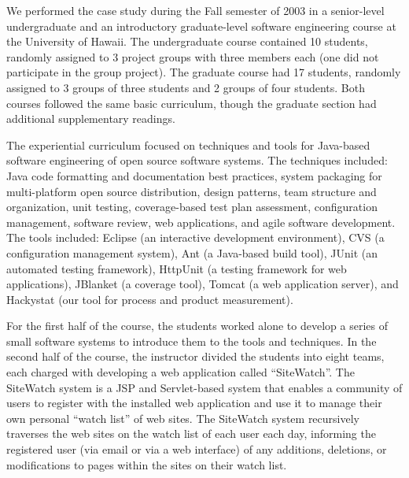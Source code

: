 \documentclass[10pt,twocolumn]{article}
\begin{document}
\label{sec:classroom}

We performed the case study during the Fall semester of 2003 in a
senior-level undergraduate and an introductory graduate-level software
engineering course at the University of Hawaii.  The undergraduate course
contained 10 students, randomly assigned to 3 project groups with
three members each (one did not participate in the group project). The
graduate course had 17 students, randomly assigned to 3 groups of
three students and 2 groups of four students.  Both courses followed the
same basic curriculum, though the graduate section had additional
supplementary readings.  

The experiential curriculum focused on techniques and tools for Java-based
software engineering of open source software systems. The techniques
included: Java code formatting and documentation best practices, system
packaging for multi-platform open source distribution, design patterns,
team structure and organization, unit testing, coverage-based test plan
assessment, configuration management, software review, web applications,
and agile software development. The tools included: Eclipse (an interactive
development environment), CVS (a configuration management system), Ant (a
Java-based build tool), JUnit (an automated testing framework), HttpUnit (a
testing framework for web applications), JBlanket (a coverage tool), Tomcat
(a web application server), and Hackystat (our tool for process and product
measurement).

For the first half of the course, the students worked alone to develop a
series of small software systems to introduce them to the tools and
techniques.  In the second half of the course, the instructor divided the
students into eight teams, each charged with developing a web application
called ``SiteWatch''.  The SiteWatch system is a JSP and Servlet-based
system that enables a community of users to register with the installed web
application and use it to manage their own personal ``watch list'' of web
sites.  The SiteWatch system recursively traverses the web sites on the
watch list of each user each day, informing the registered user (via email or via a
web interface) of any additions, deletions, or modifications to pages
within the sites on their watch list.
\end{document}
